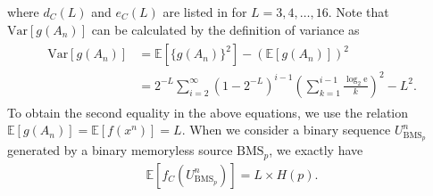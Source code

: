 where $d_C(L)$ and $e_C(L)$ are listed in \cite{coron1999security} for $L=3,4,\dots,16$.
Note that $\mathrm{Var}[g(A_n)]$ can be calculated by the definition of variance as
\begin{align}
\begin{split}
	\mathrm{Var}[g(A_n)] 
	&= \mathbb{E}[\{g(A_n)\}^2] - \left( \mathbb{E}[g(A_n)] \right)^2 \\
	&=2^{-L} \sum_{i=2}^{\infty} (1-2^{-L})^{i-1} \left( \sum_{k=1}^{i-1} \frac{\log_2 \mathrm{e}}{k} \right)^2 -L^2.
\end{split}
\end{align}
To obtain the second equality in the above equations, we use the relation $\mathbb{E}[g(A_n)]=\mathbb{E}[f(x^n)]=L$.
%
When we consider a binary sequence $U_{\mathrm{BMS}_p}^n$ generated by a binary memoryless source $\mathrm{BMS}_p$, we exactly have
\begin{align}\label{eq:E_BMS}
	\mathbb{E}[f_C(U_{\mathrm{BMS}_p}^n)] = L\times H(p).
\end{align}
%
